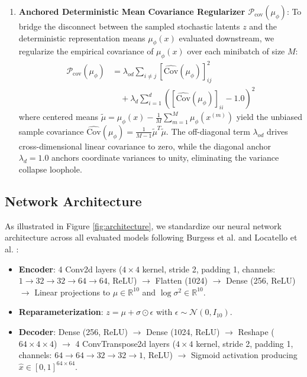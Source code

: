 \documentclass[10pt,journal,compsoc]{IEEEtran}
\begin{document}
\begin{enumerate}
    \item \textbf{Anchored Deterministic Mean Covariance Regularizer $\mathcal{P}_{\text{cov}}(\mu_\phi)$}:
    To bridge the disconnect between the sampled stochastic latents $z$ and the deterministic representation means $\mu_\phi(x)$ evaluated downstream, we regularize the empirical covariance of $\mu_\phi(x)$ over each minibatch of size $M$:
    \begin{equation}
    \begin{aligned}
    \mathcal{P}_{\text{cov}}(\mu_\phi) &= \lambda_{od} \sum_{i \ne j} \left[ \widehat{\text{Cov}}(\mu_\phi) \right]_{ij}^2 \\
    &\quad + \lambda_d \sum_{i=1}^d \left( \left[ \widehat{\text{Cov}}(\mu_\phi) \right]_{ii} - 1.0 \right)^2
    \end{aligned}
    \label{eq:cov_penalty}
    \end{equation}
    where centered means $\tilde{\mu} = \mu_\phi(x) - \frac{1}{M}\sum_{m=1}^M \mu_\phi(x^{(m)})$ yield the unbiased sample covariance $\widehat{\text{Cov}}(\mu_\phi) = \frac{1}{M-1}\tilde{\mu}^T \tilde{\mu}$.
    The off-diagonal term $\lambda_{od}$ drives cross-dimensional linear covariance to zero, while the diagonal anchor $\lambda_d = 1.0$ anchors coordinate variances to unity, eliminating the variance collapse loophole.
\end{enumerate}

\subsection{Network Architecture}
As illustrated in Figure \ref{fig:architecture}, we standardize our neural network architecture across all evaluated models following Burgess et al. \cite{burgess2018understanding} and Locatello et al. \cite{locatello2019challenging}:
\begin{itemize}
    \item \textbf{Encoder}: 4 Conv2d layers ($4\times 4$ kernel, stride 2, padding 1, channels: $1 \to 32 \to 32 \to 64 \to 64$, ReLU) $\to$ Flatten (1024) $\to$ Dense (256, ReLU) $\to$ Linear projections to $\mu \in \mathbb{R}^{10}$ and $\log\sigma^2 \in \mathbb{R}^{10}$.
    \item \textbf{Reparameterization}: $z = \mu + \sigma \odot \epsilon$ with $\epsilon \sim \mathcal{N}(0, I_{10})$.
    \item \textbf{Decoder}: Dense (256, ReLU) $\to$ Dense (1024, ReLU) $\to$ Reshape ($64 \times 4 \times 4$) $\to$ 4 ConvTranspose2d layers ($4\times 4$ kernel, stride 2, padding 1, channels: $64 \to 64 \to 32 \to 32 \to 1$, ReLU) $\to$ Sigmoid activation producing $\hat{x} \in [0, 1]^{64\times 64}$.
\end{itemize}
\end{document}
